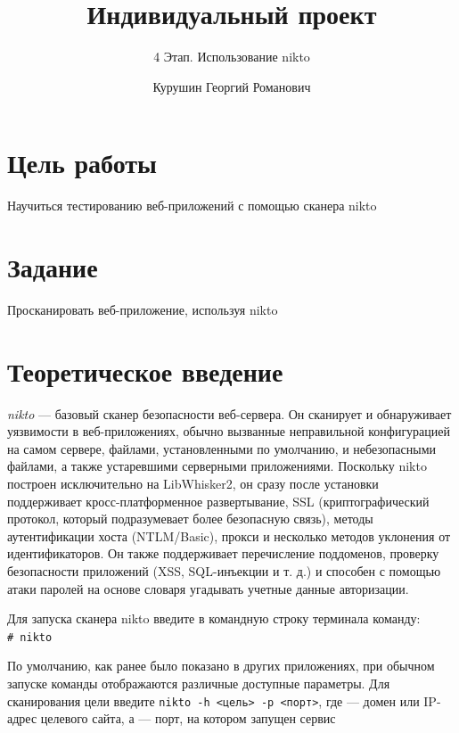 \documentclass[
  english,
  russian,
  12pt,
  a4paper,
  DIV=11,
  numbers=noendperiod]{scrreprt}
\title{Индивидуальный проект}
\subtitle{4 Этап. Использование nikto}
\author{Курушин Георгий Романович}
\date{}
\renewcommand*\contentsname{Содержание}
\newcommand\contentsname{Содержание}
\begin{document}
\maketitle

\renewcommand*\contentsname{Содержание}
{
\setcounter{tocdepth}{1}
\tableofcontents
}
\listoffigures
\listoftables

\chapter{Цель
работы}\label{ux446ux435ux43bux44c-ux440ux430ux431ux43eux442ux44b}

Научиться тестированию веб-приложений с помощью сканера nikto

\chapter{Задание}\label{ux437ux430ux434ux430ux43dux438ux435}

Просканировать веб-приложение, используя nikto

\chapter{Теоретическое
введение}\label{ux442ux435ux43eux440ux435ux442ux438ux447ux435ux441ux43aux43eux435-ux432ux432ux435ux434ux435ux43dux438ux435}

\emph{nikto} --- базовый сканер безопасности веб-сервера. Он сканирует и
обнаруживает уязвимости в веб-приложениях, обычно вызванные неправильной
конфигурацией на самом сервере, файлами, установленными по умолчанию, и
небезопасными файлами, а также устаревшими серверными приложениями.
Поскольку nikto построен исключительно на LibWhisker2, он сразу после
установки поддерживает кросс-платформенное развертывание, SSL
(криптографический протокол, который подразумевает более безопасную
связь), методы аутентификации хоста (NTLM/Basic), прокси и несколько
методов уклонения от идентификаторов. Он также поддерживает перечисление
поддоменов, проверку безопасности приложений (XSS, SQL-инъекции и т. д.)
и способен с помощью атаки паролей на основе словаря угадывать учетные
данные авторизации.

Для запуска сканера nikto введите в командную строку терминала команду:
\texttt{\#\ nikto}

По умолчанию, как ранее было показано в других приложениях, при обычном
запуске команды отображаются различные доступные параметры. Для
сканирования цели введите
\texttt{nikto\ -h\ \textless{}цель\textgreater{}\ -p\ \textless{}порт\textgreater{}},
где --- домен или IP-адрес целевого сайта, а --- порт, на котором
запущен сервис
\end{document}
